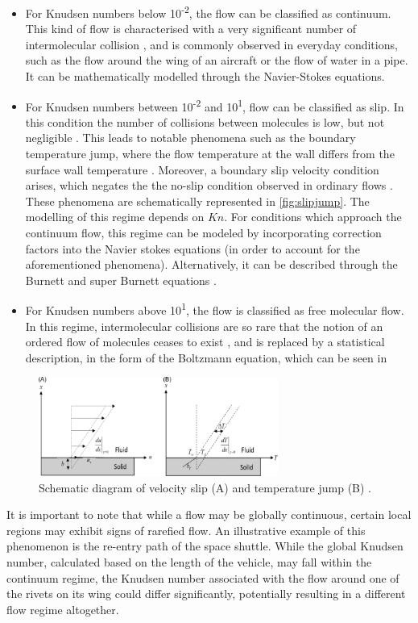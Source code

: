 \begin{itemize}
    \item For Knudsen numbers below 10\textsuperscript{-2}, the flow can be classified as continuum. This kind of flow is characterised with a very significant number of intermolecular collision \cite{aerothermonotes, chambrerarefied}, and is commonly observed in everyday conditions, such as the flow around the wing of an aircraft or the flow of water in a pipe. It can be mathematically modelled through the Navier-Stokes equations.
    \item For Knudsen numbers between 10\textsuperscript{-2} and 10\textsuperscript{1}, flow can be classified as slip. In this condition the number of collisions between molecules is low, but not negligible \cite{chambrerarefied}. This leads to notable phenomena such as the boundary temperature jump, where the flow temperature at the wall differs from the surface wall temperature \cite{slipjump}. Moreover, a boundary slip velocity condition arises, which negates the the no-slip condition observed in ordinary flows \cite{slipjump}. These phenomena are schematically represented in \autoref{fig:slipjump}. The modelling of this regime depends on $Kn$. For conditions which approach the continuum flow, this regime can be modeled by incorporating correction factors into the Navier stokes equations \cite{slipjump} (in order to account for the aforementioned phenomena). Alternatively, it can be described through the Burnett and super Burnett equations \cite{burnett}.
    \item For Knudsen numbers above 10\textsuperscript{1}, the flow is classified as free molecular flow. In this regime, intermolecular collisions are so rare that the notion of an ordered flow of molecules ceases to exist \cite{aerothermonotes, chambrerarefied}, and is replaced by a statistical description, in the form of the Boltzmann equation, which can be seen in 
\end{itemize}
\begin{figure}[ht]
    \centering
    \includegraphics[width=0.7\textwidth]{../Images/2. Background/slipjump.png}
    \caption{Schematic diagram of velocity slip (A) and temperature jump (B)  \cite{slipjump}.}
    \label{fig:slipjump}
\end{figure}
It is important to note that while a flow may be globally continuous, certain local regions may exhibit signs of rarefied flow. An illustrative example of this phenomenon is the re-entry path of the space shuttle. While the global Knudsen number, calculated based on the length of the vehicle, may fall within the continuum regime, the Knudsen number associated with the flow around one of the rivets on its wing could differ significantly, potentially resulting in a different flow regime altogether.

